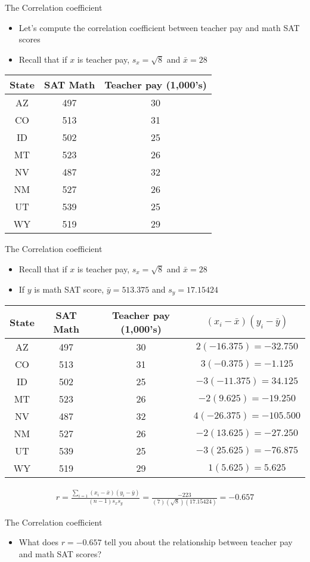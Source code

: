 \documentclass[xcolor=dvipsnames]{beamer}
\begin{document}
\begin{frame}{The Correlation coefficient}
	\begin{itemize}
		\item Let's compute the correlation coefficient between teacher pay and math SAT scores
		\item Recall that if $x$ is teacher pay, $s_x = \sqrt{8}$ and $\bar{x} = 28$
	\end{itemize}
	\begin{center}
		\begin{tabular}{|c|c|c|}
			\hline 
			\textbf{State} & \textbf{SAT Math} & \textbf{Teacher pay (1,000's)} \\ 
			\hline \hline
			AZ & 497  & 30 \\ \hline 
			CO & 513  & 31 \\ \hline 
			ID & 502  & 25  \\  \hline 
			MT & 523  & 26 \\ \hline 
			NV & 487  & 32 \\ \hline 
			NM & 527  & 26 \\ \hline 
			UT & 539  & 25 \\ \hline 
			WY & 519  & 29 \\ \hline 
		\end{tabular} 
	\end{center}
\end{frame}

\begin{frame}{The Correlation coefficient}
	\begin{itemize}
		\item Recall that if $x$ is teacher pay, $s_x = \sqrt{8}$ and $\bar{x} = 28$
		\item If $y$ is math SAT score, $\bar{y} = 513.375$ and $s_y = 17.15424$
	\end{itemize}
		{\small 
		\begin{tabular}{|c|c|c|c|}
			\hline 
			\textbf{State} & \textbf{SAT Math} & \textbf{Teacher pay (1,000's)} & $(x_i -\bar{x})(y_i - \bar{y})$\\ 
			\hline \hline
			AZ & 497  & 30 & $2 (-16.375) = -32.750$ \\ \hline 
			CO & 513  & 31 & $3 (-0.375) = -1.125 $ \\ \hline 
			ID & 502  & 25 & $-3 (-11.375) = 34.125$ \\  \hline 
			MT & 523  & 26 & $-2 (9.625) = -19.250$ \\ \hline 
			NV & 487  & 32 & $4(-26.375) = -105.500 $ \\ \hline 
			NM & 527  & 26 & $-2 (13.625) = -27.250$\\ \hline 
			UT & 539  & 25 & $-3 (25.625) =  -76.875$\\ \hline 
			WY & 519  & 29 & $1 (5.625) = 5.625$\\ \hline 
		\end{tabular} }
\begin{align*}
	r = \frac{\sum_{i=1}(x_i -\bar{x})(y_i - \bar{y})}{(n-1) s_x s_y} = \frac{-223}{(7)(\sqrt{8})(17.15424)} = -0.657
\end{align*}
\end{frame}

\begin{frame}{The Correlation coefficient}
	\begin{itemize}
		\item What does $r = -0.657$ tell you about the relationship between teacher pay and math SAT scores?
	\end{itemize}
\end{frame}
              
\end{document}
